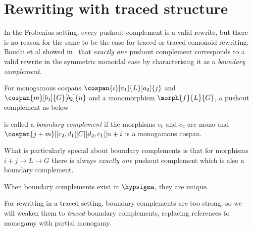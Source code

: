 \section{Rewriting with traced structure}

In the Frobenius setting, every pushout complement is a valid rewrite, but there
is no reason for the same to be the case for traced or traced comonoid
rewriting.
Bonchi et al showed in~\cite{bonchi2022stringa} that \emph{exactly one} pushout
complement corresponds to a valid rewrite in the symmetric monoidal case by
characterising it as a \emph{boundary complement}.

\begin{definition}
    For monogamous cospans \(
    \cospan{i}[a_1]{L}[a_2]{j}
    \) and \(
    \cospan{m}[b_1]{G}[b_2]{n}
    \) and a monomorphism \(\morph{f}{L}{G}\), a pushout complement as below
    \begin{center}
    \end{center}
    is called a \emph{boundary complement} if the morphisms \(c_1\) and \(c_2\) are
    mono and \(
    \cospan{j + m}[[c_2,d_1]]{C}[[d_2,c_1]]{n + i}
    \) is a monogamous cospan.
\end{definition}

What is particularly special about boundary complements is that for morphisms
\(i + j \to L \to G\) there is always \emph{exactly one} pushout
complement which is also a boundary complement.

\begin{proposition}
    When boundary complements exist in \(\hypsigma\), they are unique.
\end{proposition}

For rewriting in a traced setting, boundary complements are too strong, so we
will weaken them to \emph{traced} boundary complements, replacing references to
monogamy with partial monogamy.

